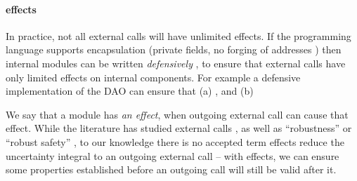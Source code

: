 \paragraph{\Tamed effects}  In practice, not all external calls will have unlimited effects.
{If the programming language supports encapsulation (\eg private
 fields, no forging of addresses %
 \etc) then internal modules can be
 written \emph{defensively} \cite{MillerPhD}, to ensure that external
 calls  {have only limited effects}  on internal components.} %
For example a defensive implementation of the DAO  \cite{DAO} can ensure that  (a)
, 
and (b) 
 

{We say that a module has \emph{\tamed an effect}, when
  outgoing external call can cause that effect.}
{While the literature has studied external
calls \cite{vanproving,cerise-jacm2024,vmsl-pldi2023,ddd},  
as well as ``robustness'' or ``robust safety'' %
\cite{gordonJefferyRobustSafety,robustSafetyPatrignani,abate2019journey}, to our
knowledge there is no accepted term }
\Tamed effects reduce the uncertainty integral to an outgoing external
call  --  with \tamed effects, we can ensure some properties established
before an outgoing call will still be valid after it. 

